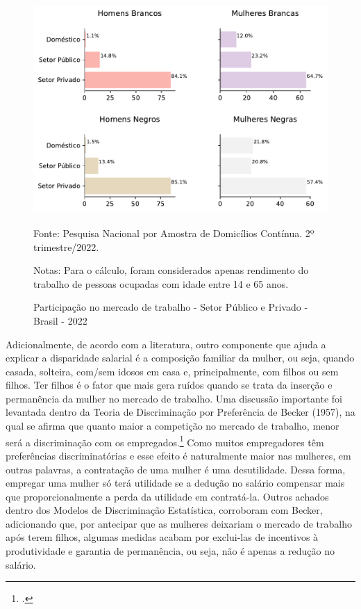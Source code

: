 \documentclass[12pt]{article}
\begin{document}
\begin{figure}[H]
    \centering
    \caption{Participação no mercado de trabalho - Setor Público e Privado - Brasil - 2022}
        \includegraphics[height=8cm]{../figures/participation.pdf}
    \label{fig:participation}
    \begin{floatnotes}
        \item[Fonte:] Pesquisa Nacional por Amostra de Domicílios Contínua. 2º trimestre/2022.
        \item[Notas:] Para o cálculo, foram considerados apenas rendimento do trabalho de pessoas ocupadas com idade entre 14 e 65 anos.
    \end{floatnotes}
\end{figure}

\par Adicionalmente, de acordo com a literatura, outro componente que ajuda a explicar a disparidade salarial é a composição familiar da mulher, ou seja, quando casada, solteira, com/sem idosos em casa e, principalmente, com filhos ou sem filhos. Ter filhos é o fator que mais gera ruídos quando se trata da inserção e permanência da mulher no mercado de trabalho. Uma discussão importante foi levantada dentro da Teoria de Discriminação por Preferência de Becker (1957), na qual se afirma que quanto maior a competição no mercado de trabalho, menor será a discriminação com os empregados.\footcite{becker1957} Como muitos empregadores têm preferências discriminatórias e esse efeito é naturalmente maior nas mulheres, em outras palavras, a contratação de uma mulher é uma desutilidade. Dessa forma, empregar uma mulher só terá utilidade se a dedução no salário compensar mais que proporcionalmente a perda da utilidade em contratá-la. Outros achados dentro dos Modelos de Discriminação Estatística, corroboram com Becker, adicionando que, por antecipar que as mulheres deixariam o mercado de trabalho após terem filhos, algumas medidas acabam por exclui-las de incentivos à produtividade e garantia de permanência, ou seja, não é apenas a redução no salário.
\end{document}
